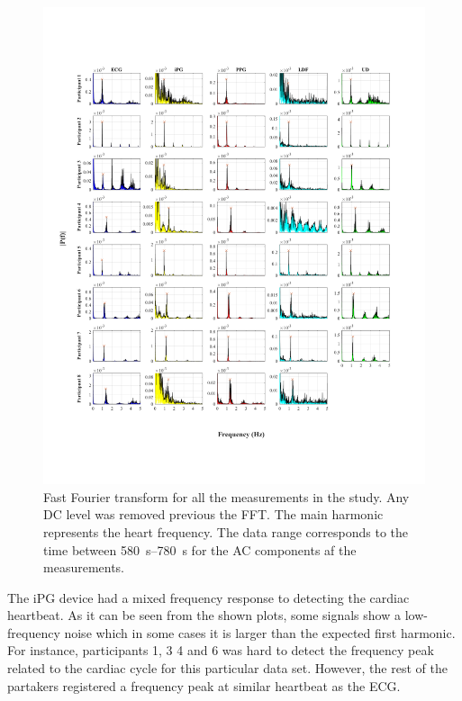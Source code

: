 \begin{figure}[!htpb]
	\includegraphics[width=1\textwidth,keepaspectratio,trim={0.75cm 0cm 2cm 2cm},clip]{figure1}    
	\caption[Fequency components of the signals acquired]{Fast Fourier transform for all the measurements in the study. Any DC level was removed previous the FFT. The main harmonic represents the heart frequency. The data range corresponds to the time between \SIrange{580}{780}{\second} for the AC components af the measurements.}
	\label{fig:fft signals}
\end{figure}

The iPG device had a mixed frequency response to detecting the cardiac heartbeat. As it can be seen from the shown plots, some signals show a low-frequency noise which in some cases it is larger than the expected first harmonic. For instance, participants 1, 3 4 and 6 was hard to detect the frequency peak related to the cardiac cycle for this particular data set. However, the rest of the partakers registered a frequency peak at similar heartbeat as the ECG. 

